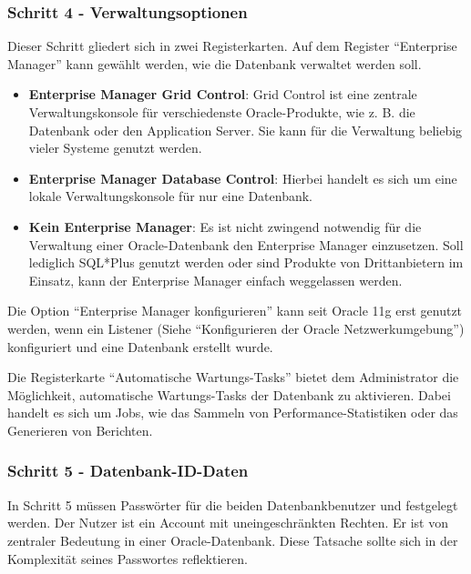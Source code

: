         \subsubsection{Schritt 4 - Verwaltungsoptionen}
          Dieser Schritt gliedert sich in zwei Registerkarten. Auf dem Register \enquote{Enterprise Manager} kann gew\"ahlt werden, wie die Datenbank verwaltet werden soll.
          \begin{itemize}
            \item \textbf{Enterprise Manager Grid Control}: Grid Control ist eine zentrale Verwaltungskonsole f\"ur verschiedenste Oracle-Produkte, wie z. B. die Datenbank oder den Application Server. Sie kann f\"ur die Verwaltung beliebig vieler Systeme genutzt werden.
            \item \textbf{Enterprise Manager Database Control}: Hierbei handelt es sich um eine lokale Verwaltungskonsole f\"ur nur eine Datenbank.
            \item \textbf{Kein Enterprise Manager}: Es ist nicht zwingend notwendig f\"ur die Verwaltung einer Oracle-Datenbank den Enterprise Manager einzusetzen. Soll lediglich SQL*Plus genutzt werden oder sind Produkte von Drittanbietern im Einsatz, kann der Enterprise Manager einfach weggelassen werden.
          \end{itemize}
          \begin{merke}
            Die Option \enquote{Enterprise Manager konfigurieren} kann seit Oracle 11g erst genutzt werden, wenn ein Listener (Siehe \enquote{Konfigurieren der Oracle Netzwerkumgebung}) konfiguriert und eine Datenbank erstellt wurde.
          \end{merke}
          Die Registerkarte \enquote{Automatische Wartungs-Tasks} bietet dem Administrator die M\"oglichkeit, automatische Wartungs-Tasks der Datenbank zu aktivieren. Dabei handelt es sich um Jobs, wie das Sammeln von Performance-Statistiken oder das Generieren von Berichten.
        \subsubsection{Schritt 5 - Datenbank-ID-Daten}
          In Schritt 5 m\"ussen Passw\"orter f\"ur die beiden Datenbankbenutzer  und  festgelegt werden. Der Nutzer  ist ein Account mit uneingeschr\"ankten Rechten. Er ist von zentraler Bedeutung in einer Oracle-Datenbank. Diese Tatsache sollte sich in der Komplexit\"at seines Passwortes reflektieren.

